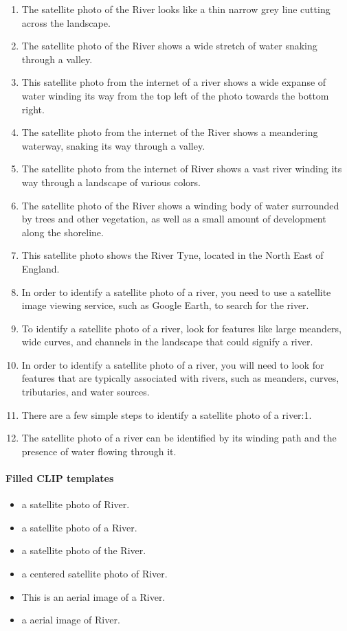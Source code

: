 \documentclass[11pt]{article}
\begin{document}
\begin{enumerate}
\item The satellite photo of the River looks like a thin narrow grey line cutting across the landscape.
\item The satellite photo of the River shows a wide stretch of water snaking through a valley.
\item This satellite photo from the internet of a river shows a wide expanse of water winding its way from the top left of the photo towards the bottom right.
\item The satellite photo from the internet of the River shows a meandering waterway, snaking its way through a valley.
\item The satellite photo from the internet of River shows a vast river winding its way through a landscape of various colors.
\item The satellite photo of the River shows a winding body of water surrounded by trees and other vegetation, as well as a small amount of development along the shoreline.
\item This satellite photo shows the River Tyne, located in the North East of England.
\item In order to identify a satellite photo of a river, you need to use a satellite image viewing service, such as Google Earth, to search for the river.
\item To identify a satellite photo of a river, look for features like large meanders, wide curves, and channels in the landscape that could signify a river.
\item In order to identify a satellite photo of a river, you will need to look for features that are typically associated with rivers, such as meanders, curves, tributaries, and water sources.
\item There are a few simple steps to identify a satellite photo of a river:1.
\item The satellite photo of a river can be identified by its winding path and the presence of water flowing through it.
\end{enumerate}
\paragraph{Filled CLIP templates}\begin{itemize}
\item a satellite photo of River.
\item a satellite photo of a River.
\item a satellite photo of the River.
\item a centered satellite photo of River.
\item This is an aerial image of a River.
\item a aerial image of River.
\end{itemize}
\end{document}
